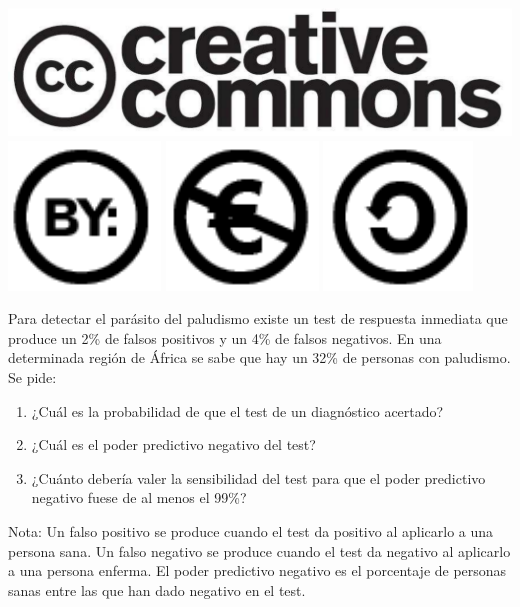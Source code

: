 \documentclass[aspectratio=149,10pt,xcolor=dvipsnames,t]{beamer}
\begin{document}
\begin{frame}[c]
\begin{center}
\biskip
\includegraphics[scale=0.07]{img/cc-logo}
\includegraphics[scale=0.2]{img/cc-by}
\includegraphics[scale=0.2]{img/cc-e}
\includegraphics[scale=0.2]{img/cc-c}\end{center}
\end{frame}

\begin{frame}[c]
Para detectar el parásito del paludismo existe un test de respuesta inmediata que produce un 2\% de falsos
positivos y un 4\% de falsos negativos. 
En una determinada región de África se sabe que hay un 32\% de personas con paludismo. 
Se pide:
\begin{enumerate}
\item ¿Cuál es la probabilidad de que el test de un diagnóstico acertado?
\item ¿Cuál es el poder predictivo negativo del test?
\item ¿Cuánto debería valer la sensibilidad del test para que el poder predictivo negativo fuese de al menos el 99\%?
\end{enumerate} 
Nota: Un falso positivo se produce cuando el test da positivo al aplicarlo a una persona sana. Un falso negativo se
produce cuando el test da negativo al aplicarlo a una persona enferma. El poder predictivo negativo es el porcentaje de
personas sanas entre las que han dado negativo en el test.
\end{frame}
\end{document}
